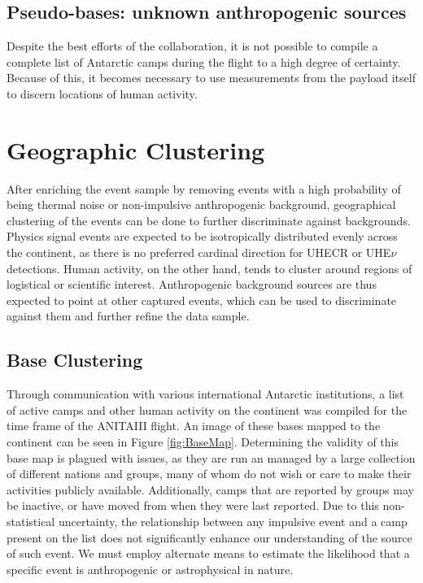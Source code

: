 	\subsection{Pseudo-bases: unknown anthropogenic sources}
		Despite the best efforts of the collaboration, it is not possible to compile a complete list of Antarctic camps during the flight to a high degree of certainty.  Because of this, it becomes necessary to use measurements from the payload itself to discern locations of human activity.  


\section{Geographic Clustering}
	After enriching the event sample by removing events with a high probability of being thermal noise or non-impulsive anthropogenic background, geographical clustering of the events can be done to further discriminate against backgrounds. Physics signal events are expected to be isotropically distributed evenly across the continent, as there is no preferred cardinal direction for UHECR or UHE$\nu$ detections.  Human activity, on the other hand, tends to cluster around regions of logistical or scientific interest.  Anthropogenic background sources are thus expected to point at other captured events, which can be used to discriminate against them and further refine the data sample. 

	\subsection{Base Clustering}
		Through communication with various international Antarctic institutions, a list of active camps and other human activity on the continent was compiled for the time frame of the ANITAIII flight.  An image of these bases mapped to the continent can be seen in Figure \ref{fig:BaseMap}.  Determining the validity of this base map is plagued with issues, as they are run an managed by a large collection of different nations and groups, many of whom do not wish or care to make their activities publicly available.  Additionally, camps that are reported by groups may be inactive, or have moved from when they were last reported.  Due to this non-statistical uncertainty, the relationship between any impulsive event and a camp present on the list does not significantly enhance our understanding of the source of such event.  We must employ alternate means to estimate the likelihood that a specific event is anthropogenic or astrophysical in nature.
		
